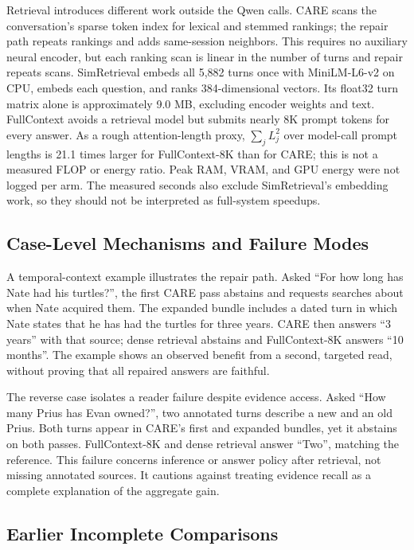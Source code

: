 \documentclass[11pt]{article}
\newcommand{\care}{\textsc{CARE}}
\begin{document}
Retrieval introduces different work outside the Qwen calls. \care{} scans
the conversation's sparse token index for lexical and stemmed rankings;
the repair path repeats rankings and adds same-session neighbors. This
requires no auxiliary neural encoder, but each ranking scan is linear in
the number of turns and repair repeats scans. SimRetrieval embeds all 5,882 turns
once with MiniLM-L6-v2 on CPU, embeds each question, and ranks 384-dimensional
vectors. Its float32 turn matrix alone is approximately 9.0 MB, excluding
encoder weights and text. FullContext avoids a retrieval model but submits
nearly 8K prompt tokens for every answer. As a rough attention-length proxy,
$\sum_j L_j^2$ over model-call prompt lengths is 21.1 times larger for
FullContext-8K than for \care{}; this is not a measured FLOP or energy ratio.
Peak RAM, VRAM, and GPU energy were not logged per arm. The measured seconds
also exclude SimRetrieval's embedding work, so they should not be interpreted
as full-system speedups.

\subsection{Case-Level Mechanisms and Failure Modes}

A temporal-context example illustrates the repair path. Asked ``For how long
has Nate had his turtles?'', the first \care{} pass abstains and requests
searches about when Nate acquired them. The expanded bundle includes a dated
turn in which Nate states that he has had the turtles for three years.
\care{} then answers ``3 years'' with that source; dense retrieval abstains and FullContext-8K
answers ``10 months''. The example shows an observed benefit from a second,
targeted read, without proving that all repaired answers are faithful.

The reverse case isolates a reader failure despite evidence access. Asked
``How many Prius has Evan owned?'', two annotated turns describe a new and
an old Prius. Both turns
appear in \care{}'s first and expanded bundles, yet it abstains on both
passes. FullContext-8K and dense retrieval answer ``Two'', matching the
reference. This failure concerns inference or answer policy after retrieval,
not missing annotated sources. It cautions against treating evidence recall
as a complete explanation of the aggregate gain.

\subsection{Earlier Incomplete Comparisons}
\end{document}
